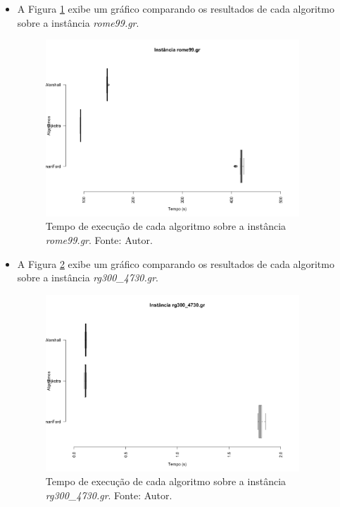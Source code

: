 \documentclass{beamer}
\begin{document}
	
	\begin{frame}{}
		\begin{itemize}
			\item A Figura \ref{fig:rome} exibe um gráfico comparando os resultados de cada algoritmo sobre a instância \textit{rome99.gr}.
			
			\begin{figure}[H]
				\centering
				\includegraphics[width=0.9\textwidth]{img/rome99.png}
				\caption{Tempo de execução de cada algoritmo sobre a instância \textit{rome99.gr}. Fonte: Autor.}
				\label{fig:rome}
			\end{figure}
		\end{itemize}
	\end{frame}
	
	\begin{frame}{}
		\begin{itemize}
			\item A Figura \ref{fig:rg300_4730} exibe um gráfico comparando os resultados de cada algoritmo sobre a instância \textit{ rg300\_4730.gr}.
			
			\begin{figure}[H]
				\centering
				\includegraphics[width=0.9\textwidth]{img/rg300_4730.png}
				\caption{Tempo de execução de cada algoritmo sobre a instância \textit{rg300\_4730.gr}. Fonte: Autor.}
				\label{fig:rg300_4730}
			\end{figure}
		\end{itemize}
	\end{frame}
	
\end{document}
